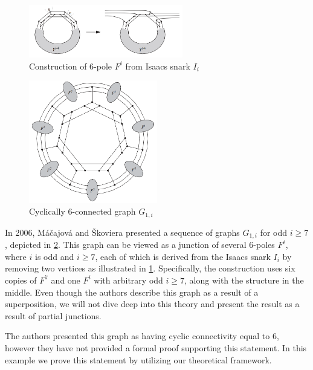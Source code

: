 \documentclass[12pt, twoside]{book}
\begin{document}
\begin{example}
	\begin{figure}
		\centering
		\includegraphics[width=0.6\textwidth]{images/create-Fi-from-Isaacs}
		\caption{\cite{Macajova2006} Construction of 6-pole $F^i$ from Isaacs snark $I_i$}
		\label{fig:construction-fi-from-isaacs}
	\end{figure}

	\begin{figure}
		\centering
		\includegraphics[width=0.5\textwidth]{images/snark-Gi-from-Isaacs}
		\caption{\cite{Macajova2006} Cyclically 6-connected graph $G_{1,i}$}
		\label{fig:cyc-6-graph-Macajova}
	\end{figure}

	In 2006, Máčajová and Škoviera presented a sequence of graphs $G_{1,i}$ for odd $i\geq 7$ \cite{Macajova2006}, depicted in \cref{fig:cyc-6-graph-Macajova}. This graph can be viewed as a junction of several 6-poles $F^i$, where $i$ is odd and $i\geq 7$, each of which is derived from the Isaacs snark $I_i$ \cite{Isaacs1975} by removing two vertices as illustrated in \cref{fig:construction-fi-from-isaacs}. Specifically, the construction uses six copies of $F^7$ and one $F^i$ with arbitrary odd $i\geq 7$, along with the structure in the middle. Even though the authors describe this graph as a result of a superposition, we will not dive deep into this theory and present the result as a result of partial junctions.
	
	The authors presented this graph as having cyclic connectivity equal to 6, however they have not provided a formal proof supporting this statement. In this example we prove this statement by utilizing our theoretical framework.
	

\end{example}
\end{document}
